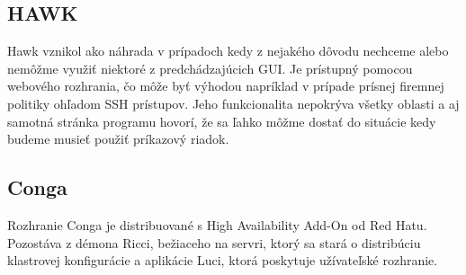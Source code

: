 \subsection{HAWK}
Hawk vznikol ako náhrada v prípadoch kedy z nejakého dôvodu nechceme alebo nemôžme využiť niektoré z predchádzajúcich GUI. Je prístupný pomocou webového rozhrania, čo môže byť výhodou napríklad v prípade prísnej firemnej politiky ohľadom SSH prístupov. Jeho funkcionalita nepokrýva všetky oblasti a aj samotná stránka programu hovorí, že sa ľahko môžme dostať do situácie kedy budeme musieť použiť príkazový riadok.

\subsection{Conga}
Rozhranie Conga je distribuované s High Availability Add-On od Red Hatu. Pozostáva z démona Ricci, bežiaceho na servri, ktorý sa stará o distribúciu klastrovej konfigurácie a aplikácie Luci, ktorá poskytuje užívateľské rozhranie.

\emptydoublepage